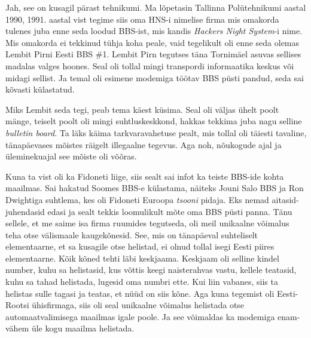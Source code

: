 
Jah, see on kusagil pärast tehnikumi. Ma lõpetasin Tallinna 
Polütehnikumi aastal 1990, 1991. aastal vist 
tegime siis oma HNS-i nimelise firma mis omakorda tulenes juba enne 
seda loodud BBS-ist, mis kandis \emph{Hackers Night System}-i nime. Mis omakorda ei tekkinud tühja koha peale, vaid tegelikult 
oli enne seda olemas Lembit Pirni Eesti BBS 
\#1. Lembit Pirn tegutses täna Tornimäel asuvas 
sellises madalas valges hoones. Seal oli tollal mingi transpordi informaatika 
keskus või midagi sellist. Ja temal oli esimene modemiga töötav BBS püsti 
pandud, seda sai kõvasti  külastatud. 


Miks Lembit seda tegi, peab tema käest küsima. Seal oli väljas ühelt poolt 
mänge, teiselt poolt  oli mingi suhtluskeskkond, hakkas tekkima juba nagu 
selline \emph{bulletin board}. Ta läks käima tarkvaravahetuse pealt, mis tollal 
oli täiesti tavaline, tänapäevases mõistes räigelt illegaalne tegevus. Aga noh, 
nõukogude ajal ja üleminekuajal see mõiste oli võõras. 

Kuna ta vist oli ka Fidoneti liige, siis sealt sai infot ka teiste BBS-ide 
kohta maailmas. Sai hakatud Soomes BBS-e külastama, näiteks Jouni Salo 
BBS ja Ron Dwightiga suhtlema, kes  oli 
 Fidoneti Euroopa \emph{tsooni} pidaja. Eks nemad aitasid-juhendasid edasi 
ja sealt tekkis loomulikult mõte oma BBS püsti panna. Tänu sellele, et me saime 
isa firma ruumides tegutseda, oli meil unikaalne võimalus teha otse välismaale 
kaugekõnesid. See, mis on tänapäeval suhteliselt elementaarne, et sa kusagile 
otse helistad, ei olnud tollal isegi Eesti piires elementaarne. Kõik kõned 
tehti läbi keskjaama. Keskjaam oli  selline kindel number, kuhu sa helistasid, 
kus võttis keegi naisterahvas vastu,  kellele  teatasid, kuhu sa tahad 
helistada, lugesid oma numbri ette. Kui liin vabanes, siis ta  helistas sulle 
tagasi ja teatas, et nüüd on siis kõne. Aga kuna tegemist oli Eesti-Rootsi 
ühisfirmaga, siis oli seal unikaalne võimalus  helistada otse automaatvalimisega 
 maailmas igale poole. Ja see võimaldas ka modemiga enam-vähem 
üle kogu maailma helistada.


